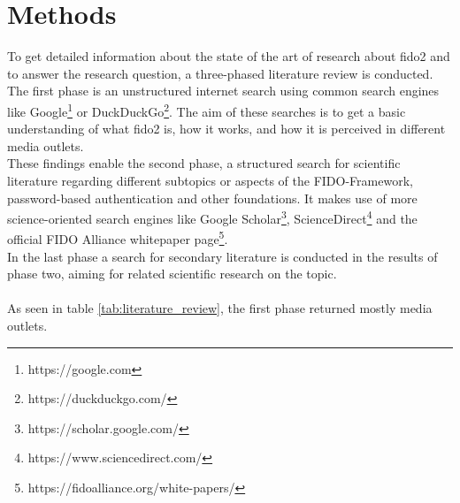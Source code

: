 
\section{Methods}
\label{sec:methods}


To get detailed information about the state of the art of research about \ac{fido2} and to answer the research question, a three-phased literature review is conducted.\\
The first phase is an unstructured internet search using common search engines like Google\footnote{https://google.com} or DuckDuckGo\footnote{https://duckduckgo.com/}. The aim of these searches is to get a basic understanding of what \ac{fido2} is, how it works, and how it is perceived in different media outlets.\\
These findings enable the second phase, a structured search for scientific literature regarding different subtopics or aspects of the FIDO-Framework, password-based authentication and other foundations. It makes use of more science-oriented search engines like Google Scholar\footnote{https://scholar.google.com/}, ScienceDirect\footnote{https://www.sciencedirect.com/} and the official FIDO Alliance whitepaper page\footnote{https://fidoalliance.org/white-papers/}.\\
In the last phase a search for secondary literature is conducted in the results of phase two, aiming for related scientific research on the topic.\\
\\
As seen in table \ref{tab:literature_review}, the first phase returned mostly media outlets.

